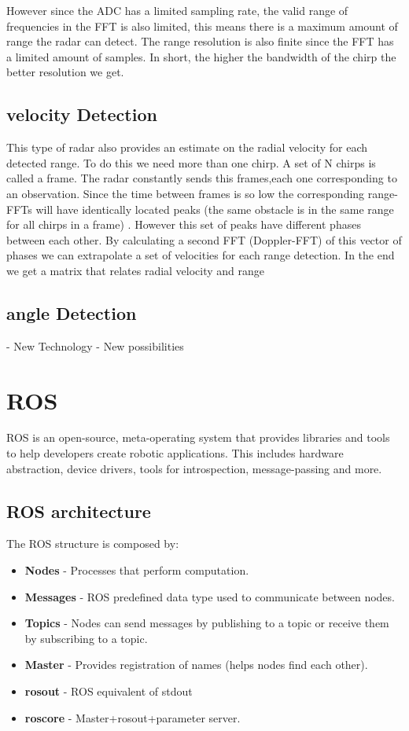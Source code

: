  However since the \ac{ADC} has a limited sampling rate, the valid range of frequencies in the \ac{FFT} is also limited, this means there is a maximum amount of range the radar can detect.
The range resolution is also finite since the \ac{FFT} has a limited amount of samples. In short, the higher the bandwidth of the chirp the better resolution we get.
 
\subsection{velocity Detection}
This type of radar also provides an estimate on the radial velocity for each detected range. To do this we need more than one chirp. A set of N chirps is called a frame. The radar constantly sends this frames,each one corresponding to an observation. Since the time between frames is so low the corresponding range-\ac{FFT}s will have  identically located peaks (the same obstacle is in the same range for all chirps in a frame) . However this set of peaks have different phases between each other. By calculating a second \ac{FFT} (Doppler-FFT) of this vector of phases we can extrapolate a set of velocities  for each range detection. In the end we get a matrix that relates radial velocity and range 
\subsection{angle Detection}

- New Technology
- New possibilities
\section {ROS}
\ac{ROS} is an open-source, meta-operating system that provides libraries and tools to help developers create robotic applications. This includes hardware abstraction, device drivers, tools for introspection, message-passing and more.
\subsection{ROS architecture}
The ROS structure is composed by:
\begin{itemize}
\item \textbf{Nodes} - Processes that perform computation.
\item \textbf{Messages} - ROS predefined data type used to communicate between nodes. 
\item \textbf{Topics} - Nodes can send messages by publishing to a topic or receive them by subscribing to a topic. 
\item \textbf{Master} - Provides registration of names (helps nodes find each other).
\item \textbf{rosout} - ROS equivalent of stdout 
\item \textbf{roscore} - Master+rosout+parameter server. 
\end{itemize}

